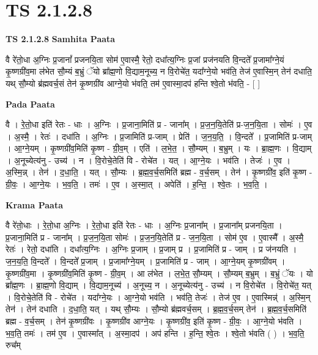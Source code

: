 \documentclass[17pt]{extarticle}
\begin{document}
\section{ TS 2.1.2.8 }

\textbf{TS 2.1.2.8 } \newline
\textbf{Samhita Paata} \newline

वै रे॑तो॒धा अ॒ग्निः प्र॒जानां᳚ प्रजनयि॒ता सोम॑ ए॒वास्मै॒ रेतो॒ दधा᳚त्य॒ग्निः प्र॒जां प्रज॑नयति वि॒न्दते᳚ प्र॒जामा᳚ग्ने॒यं कृ॒ष्णग्री॑व॒मा ल॑भेत सौ॒म्यं ब॒भ्रुं ॅयो ब्रा᳚ह्म॒णो वि॒द्याम॒नूच्य॒ न वि॒रोचे॑त॒ यदा᳚ग्ने॒यो भव॑ति॒ तेज॑ ए॒वास्मि॒न् तेन॑ दधाति॒ यथ् सौ॒म्यो ब्र॑ह्मवर्च॒सं तेन॑ कृ॒ष्णग्री॑व आग्ने॒यो भ॑वति॒ तम॑ ए॒वास्मा॒दप॑ हन्ति श्वे॒तो भ॑वति॒ - [  ] \newline

\textbf{Pada Paata} \newline

वै । रे॒तो॒धा इति॑ रेतः - धाः । अ॒ग्निः । प्र॒जाना॒मिति॑ प्र - जाना᳚म् । प्र॒ज॒न॒यि॒तेति॑ प्र-ज॒न॒यि॒ता । सोमः॑ । ए॒व । अ॒स्मै॒ । रेतः॑ । दधा॑ति । अ॒ग्निः । प्र॒जामिति॑ प्र-जाम् । प्रेति॑ । ज॒न॒य॒ति॒ । वि॒न्दते᳚ । प्र॒जामिति॑ प्र-जाम् । आ॒ग्ने॒यम् । कृ॒ष्णग्री॑व॒मिति॑ कृ॒ष्ण - ग्री॒व॒म् । एति॑ । ल॒भे॒त॒ । सौ॒म्यम् । ब॒भ्रुम् । यः । ब्रा॒ह्म॒णः । वि॒द्याम् । अ॒नूच्येत्य॑नु - उच्य॑ । न । वि॒रोचे॒तेति॑ वि - रोचे॑त । यत् । आ॒ग्ने॒यः । भव॑ति । तेजः॑ । ए॒व । अ॒स्मि॒न्न् । तेन॑ । द॒धा॒ति॒ । यत् । सौ॒म्यः । ब्र॒ह्म॒व॒र्च॒समिति॑ ब्रह्म - व॒र्च॒सम् । तेन॑ । कृ॒ष्णग्री॑व॒ इति॑ कृ॒ष्ण - ग्री॒वः॒ । आ॒ग्ने॒यः । भ॒व॒ति॒ । तमः॑ । ए॒व । अ॒स्मा॒त् । अपेति॑ । ह॒न्ति॒ । श्वे॒तः । भ॒व॒ति॒ ।  \newline


\textbf{Krama Paata} \newline

वै रे॑तो॒धाः । रे॒तो॒धा अ॒ग्निः । रे॒तो॒धा इति॑ रेतः - धाः । अ॒ग्निः प्र॒जाना᳚म् । प्र॒जाना᳚म् प्रजनयि॒ता । प्र॒जाना॒मिति॑ प्र - जाना᳚म् । प्र॒ज॒न॒यि॒ता सोमः॑ । प्र॒ज॒न॒यि॒तेति॑ प्र - ज॒न॒यि॒ता । सोम॑ ए॒व । ए॒वास्मै᳚ । अ॒स्मै॒ रेतः॑ । रेतो॒ दधा॑ति । दधा᳚त्य॒ग्निः । अ॒ग्निः प्र॒जाम् । प्र॒जाम् प्र । प्र॒जामिति॑ प्र - जाम् । प्र ज॑नयति । ज॒न॒य॒ति॒ वि॒न्दते᳚ । वि॒न्दते᳚ प्र॒जाम् । प्र॒जामा᳚ग्ने॒यम् । प्र॒जामिति॑ प्र - जाम् । आ॒ग्ने॒यम् कृ॒ष्णग्री॑वम् । कृ॒ष्णग्री॑व॒मा । कृ॒ष्णग्री॑व॒मिति॑ कृ॒ष्ण - ग्री॒व॒म् । आ ल॑भेत । ल॒भे॒त॒ सौ॒म्यम् । सौ॒म्यम् ब॒भ्रुम् । ब॒भ्रुं ॅयः । यो ब्रा᳚ह्म॒णः । ब्रा॒ह्म॒णो वि॒द्याम् । वि॒द्याम॒नूच्य॑ । अ॒नूच्य॒ न । अ॒नूच्येत्य॑नु - उच्य॑ । न वि॒रोचे॑त । वि॒रोचे॑त॒ यत् । वि॒रोचे॒तेति॑ वि - रोचे॑त । यदा᳚ग्ने॒यः । आ॒ग्ने॒यो भव॑ति । भव॑ति॒ तेजः॑ । तेज॑ ए॒व । ए॒वास्मिन्न्॑ । अ॒स्मि॒न् तेन॑ । तेन॑ दधाति । द॒धा॒ति॒ यत् । यथ् सौ॒म्यः । सौ॒म्यो ब्र॑ह्मवर्च॒सम् । ब्र॒ह्म॒व॒र्च॒सम् तेन॑ । ब्र॒ह्म॒व॒र्च॒समिति॑ ब्रह्म - व॒र्च॒सम् । तेन॑ कृ॒ष्णग्री॑वः । कृ॒ष्णग्री॑व आग्ने॒यः । कृ॒ष्णग्री॑व॒ इति॑ कृ॒ष्ण - ग्री॒वः॒ । आ॒ग्ने॒यो भ॑वति । भ॒व॒ति॒ तमः॑ । तम॑ ए॒व । ए॒वास्मा᳚त् । अ॒स्मा॒दप॑ । अप॑ हन्ति । ह॒न्ति॒ श्वे॒तः । श्वे॒तो भ॑वति ( ) । भ॒व॒ति॒ रुच᳚म् \newline
\end{document}
